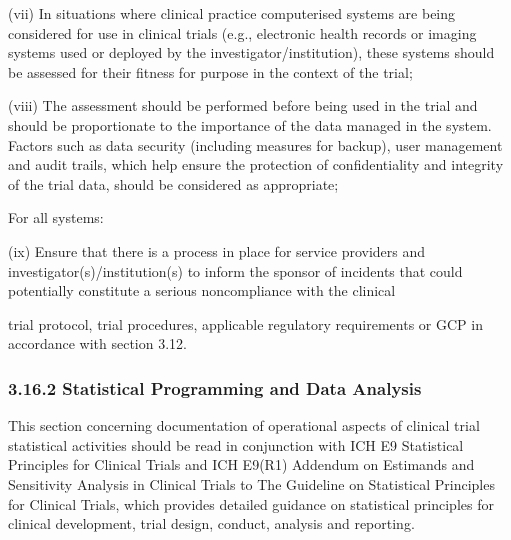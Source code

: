 \documentclass[11pt]{article}
\begin{document}
(vii) In situations where clinical practice computerised systems are being considered for use in clinical trials (e.g., electronic health records or imaging systems used or deployed by the investigator/institution), these systems should be assessed for their fitness for purpose in the context of the trial;


(viii) The assessment should be performed before being used in the trial and should be proportionate to the importance of the data managed in the system. Factors such as data security (including measures for backup), user management and audit trails, which help ensure the protection of confidentiality and integrity of the trial data, should be considered as appropriate;


For all systems:


(ix) Ensure that there is a process in place for service providers and investigator(s)/institution(s) to inform the sponsor of incidents that could potentially constitute a serious noncompliance with the clinical


trial protocol, trial procedures, applicable regulatory requirements or GCP in accordance with section 3.12.


\subsubsection{3.16.2 Statistical Programming and Data Analysis}

This section concerning documentation of operational aspects of clinical trial statistical activities should be read in conjunction with ICH E9 Statistical Principles for Clinical Trials and ICH E9(R1) Addendum on Estimands and Sensitivity Analysis in Clinical Trials to The Guideline on Statistical Principles for Clinical Trials, which provides detailed guidance on statistical principles for clinical development, trial design, conduct, analysis and reporting.
\end{document}
